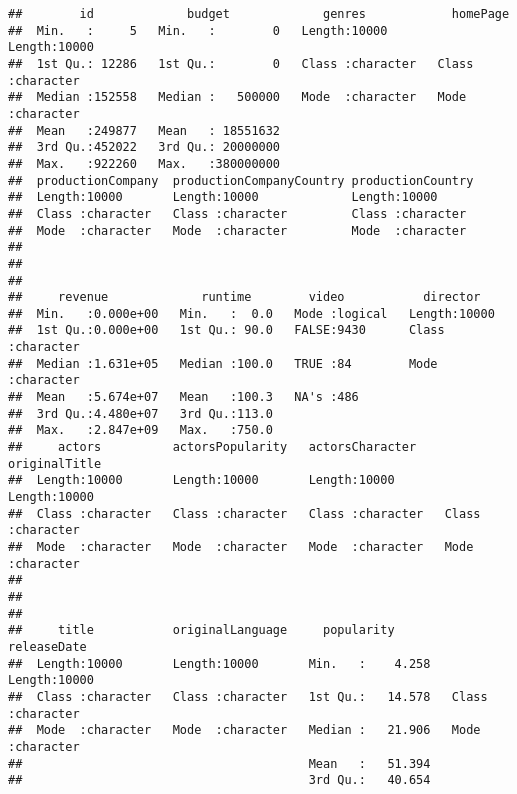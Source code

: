 \documentclass[
]{article}
\begin{document}
\begin{verbatim}
##        id             budget             genres            homePage        
##  Min.   :     5   Min.   :        0   Length:10000       Length:10000      
##  1st Qu.: 12286   1st Qu.:        0   Class :character   Class :character  
##  Median :152558   Median :   500000   Mode  :character   Mode  :character  
##  Mean   :249877   Mean   : 18551632                                        
##  3rd Qu.:452022   3rd Qu.: 20000000                                        
##  Max.   :922260   Max.   :380000000                                        
##  productionCompany  productionCompanyCountry productionCountry 
##  Length:10000       Length:10000             Length:10000      
##  Class :character   Class :character         Class :character  
##  Mode  :character   Mode  :character         Mode  :character  
##                                                                
##                                                                
##                                                                
##     revenue             runtime        video           director        
##  Min.   :0.000e+00   Min.   :  0.0   Mode :logical   Length:10000      
##  1st Qu.:0.000e+00   1st Qu.: 90.0   FALSE:9430      Class :character  
##  Median :1.631e+05   Median :100.0   TRUE :84        Mode  :character  
##  Mean   :5.674e+07   Mean   :100.3   NA's :486                         
##  3rd Qu.:4.480e+07   3rd Qu.:113.0                                     
##  Max.   :2.847e+09   Max.   :750.0                                     
##     actors          actorsPopularity   actorsCharacter    originalTitle     
##  Length:10000       Length:10000       Length:10000       Length:10000      
##  Class :character   Class :character   Class :character   Class :character  
##  Mode  :character   Mode  :character   Mode  :character   Mode  :character  
##                                                                             
##                                                                             
##                                                                             
##     title           originalLanguage     popularity        releaseDate       
##  Length:10000       Length:10000       Min.   :    4.258   Length:10000      
##  Class :character   Class :character   1st Qu.:   14.578   Class :character  
##  Mode  :character   Mode  :character   Median :   21.906   Mode  :character  
##                                        Mean   :   51.394                     
##                                        3rd Qu.:   40.654                     

\end{verbatim}
\end{document}
